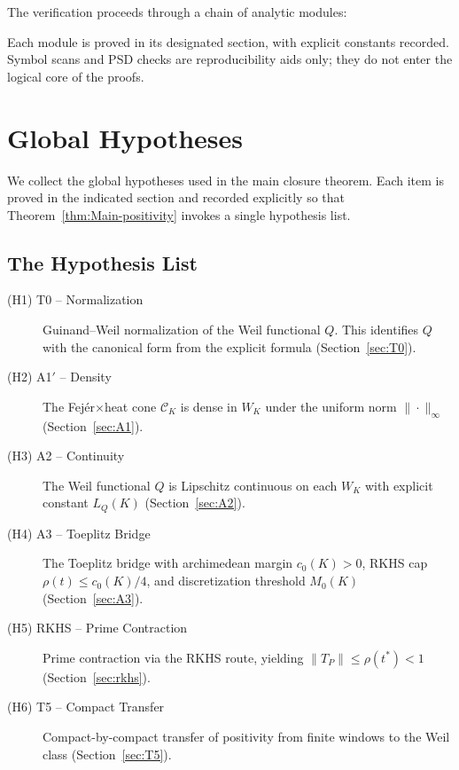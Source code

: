 The verification proceeds through a chain of analytic modules:

\begin{center}
\end{center}

Each module is proved in its designated section, with explicit constants recorded. Symbol scans and PSD checks are reproducibility aids only; they do not enter the logical core of the proofs.

\section{Global Hypotheses}\label{sec:global-hyp}

We collect the global hypotheses used in the main closure theorem. Each item is proved in the indicated section and recorded explicitly so that Theorem~\ref{thm:Main-positivity} invokes a single hypothesis list.

\subsection{The Hypothesis List}

\begin{description}
  \item[(H1) T0 -- Normalization] Guinand--Weil normalization of the Weil functional $Q$. This identifies $Q$ with the canonical form from the explicit formula (Section~\ref{sec:T0}).

  \item[(H2) A1$'$ -- Density] The Fej\'er$\times$heat cone $\mathcal{C}_K$ is dense in $W_K$ under the uniform norm $\|\cdot\|_\infty$ (Section~\ref{sec:A1}).

  \item[(H3) A2 -- Continuity] The Weil functional $Q$ is Lipschitz continuous on each $W_K$ with explicit constant $L_Q(K)$ (Section~\ref{sec:A2}).

  \item[(H4) A3 -- Toeplitz Bridge] The Toeplitz bridge with archimedean margin $c_0(K) > 0$, RKHS cap $\rho(t) \leq c_0(K)/4$, and discretization threshold $M_0(K)$ (Section~\ref{sec:A3}).

  \item[(H5) RKHS -- Prime Contraction] Prime contraction via the RKHS route, yielding $\|T_P\| \leq \rho(t^*) < 1$ (Section~\ref{sec:rkhs}).

\item[(H6) T5 -- Compact Transfer] Compact-by-compact transfer of positivity from finite windows to the Weil class (Section~\ref{sec:T5}).
\end{description}


